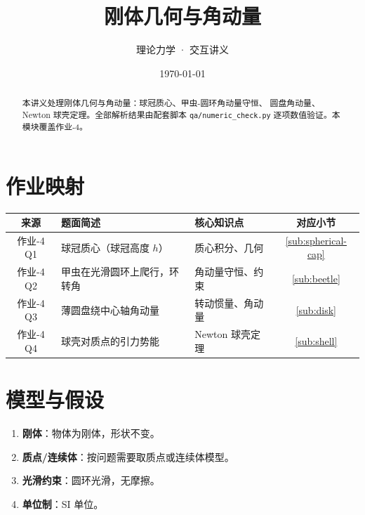 \documentclass[UTF8,a4paper,11pt]{ctexart}
\title{\textbf{刚体几何与角动量}}
\author{理论力学 · 交互讲义}
\date{\today}
\begin{document}
\maketitle

\begin{abstract}
本讲义处理刚体几何与角动量：球冠质心、甲虫-圆环角动量守恒、
圆盘角动量、Newton 球壳定理。全部解析结果由配套脚本
\texttt{qa/numeric\_check.py} 逐项数值验证。本模块覆盖作业-4。
\end{abstract}

\tableofcontents
\newpage

\section{作业映射}
\label{sec:map}

\begin{center}
\small
\begin{tabular}{cp{6.5cm}p{3.5cm}c}
\toprule
来源 & 题面简述 & 核心知识点 & 对应小节 \\
\midrule
作业-4 Q1 & 球冠质心（球冠高度 $h$） &
  质心积分、几何 & \ref{sub:spherical-cap} \\
作业-4 Q2 & 甲虫在光滑圆环上爬行，环转角 &
  角动量守恒、约束 & \ref{sub:beetle} \\
作业-4 Q3 & 薄圆盘绕中心轴角动量 &
  转动惯量、角动量 & \ref{sub:disk} \\
作业-4 Q4 & 球壳对质点的引力势能 &
  Newton 球壳定理 & \ref{sub:shell} \\
\bottomrule
\end{tabular}
\end{center}

\section{模型与假设}
\label{sec:model}

\begin{enumerate}
  \item \textbf{刚体}：物体为刚体，形状不变。
  \item \textbf{质点/连续体}：按问题需要取质点或连续体模型。
  \item \textbf{光滑约束}：圆环光滑，无摩擦。
  \item \textbf{单位制}：SI 单位。
\end{enumerate}

\end{document}
